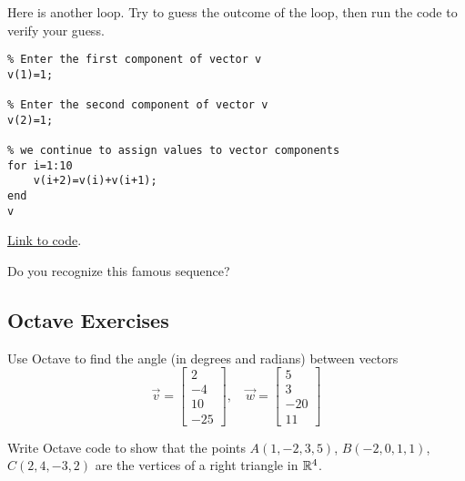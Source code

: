 \documentclass{ximera}
\begin{document}
\begin{example}\label{ex:loop2}
    Here is another loop.  Try to guess the outcome of the loop, then run the code to verify your guess.

    \begin{verbatim}
% Enter the first component of vector v
v(1)=1;

% Enter the second component of vector v
v(2)=1;

% we continue to assign values to vector components
for i=1:10
    v(i+2)=v(i)+v(i+1);
end
v
    \end{verbatim}

\href{https://sagecell.sagemath.org/?z=eJx9jsEKwkAMRO-C_zCXQpdeXI9Kj35IWVNd0EQ26fr7ZouIXgyBDCFvJh1ObFRgV8KcixqS3B_CxAaZUSmZFFRgu6l9DGM8NundfYFKSfj8j9z_kE_yW7bMC8EEk2q-MOp0W0jb4s1-_LSRs2_yGA9xt_p41T4PbuwjDE3HsEaQv9JCX9KTQAQ=&lang=octave&interacts=eJyLjgUAARUAuQ==}{Link to code}.   

Do you recognize this famous sequence?
\end{example}

\subsection*{Octave Exercises}

\begin{problem}\label{prob_oct_vec_2}
    Use Octave to find the angle (in degrees and radians) between vectors 
    $$\vec{v}=\begin{bmatrix}2\\-4\\10\\-25\end{bmatrix},\quad\vec{w}=\begin{bmatrix}5\\3\\-20\\11\end{bmatrix}$$
\end{problem}

\begin{problem}\label{prob_oct_vec_3}
Write Octave code to show that the points $A(1, -2, 3, 5)$, $B(-2, 0, 1, 1)$, $C(2, 4, -3, 2)$ are the vertices of a right triangle in $\mathbb{R}^4$.
\end{problem}
\end{document}
